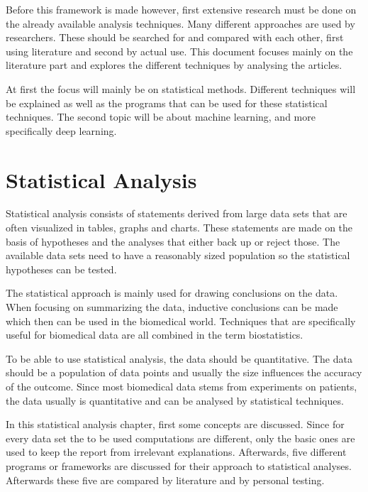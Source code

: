 \documentclass[10pt,a4paper]{article}
\begin{document}
	Before this framework is made however, first extensive research must be done on the already available analysis techniques. Many different approaches are used by researchers. These should be searched for and compared with each other, first using literature and second by actual use. This document focuses mainly on the literature part and explores the different techniques by analysing the articles.
	
	At first the focus will mainly be on statistical methods. Different 
	techniques will be explained as well as the programs that can be used for 
	these statistical techniques. The second topic will be about machine 
	learning, and more specifically deep learning. 
	
	\clearpage
	
	\section{Statistical Analysis}
	
	Statistical analysis consists of statements derived from large data sets that are often visualized in tables, graphs and charts. These statements are made on the basis of hypotheses and the analyses that either back up or reject those. The available data sets need to have a reasonably sized population so the statistical hypotheses can be tested. \cite{woolson2011statistical} 
	
	The statistical approach is mainly used for drawing conclusions on the 
	data. When focusing on summarizing the data, inductive conclusions can be 
	made which then can be used in the biomedical world. Techniques that are 
	specifically useful for biomedical data are all combined in the term 
	biostatistics. \cite{woolson2011statistical} 
	
	To be able to use statistical analysis, the data should be quantitative. The data should be a population of data points and usually the size influences the accuracy of the outcome. Since most biomedical data stems from experiments on patients, the data usually is quantitative and can be analysed by statistical techniques. \cite{sapsford2006data}
	
	In this statistical analysis chapter, first some concepts are discussed. 
	Since for every data set the to be used computations are different, only 
	the basic ones are used to keep the report from irrelevant explanations. 
	Afterwards, five different programs or frameworks are discussed for their 
	approach to statistical analyses. Afterwards these five are compared by 
	literature and by personal testing.
	
\end{document}
